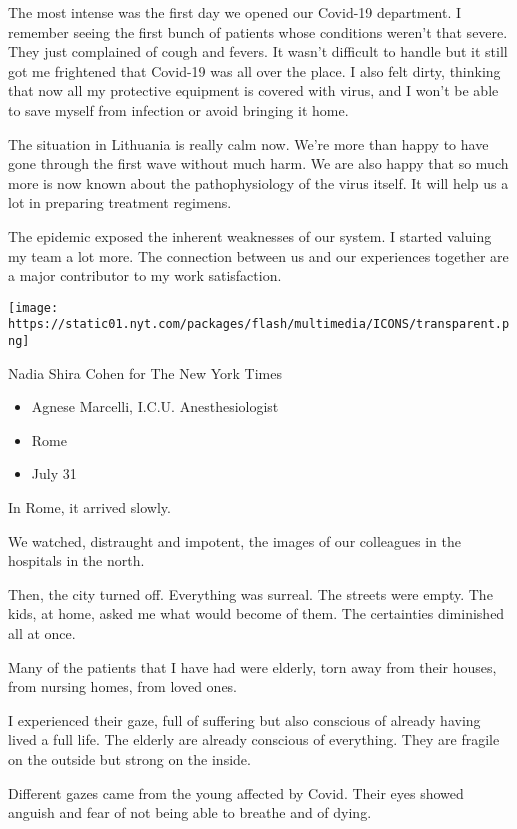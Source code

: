 The most intense was the first day we opened our Covid-19 department. I
remember seeing the first bunch of patients whose conditions weren't
that severe. They just complained of cough and fevers. It wasn't
difficult to handle but it still got me frightened that Covid-19 was all
over the place. I also felt dirty, thinking that now all my protective
equipment is covered with virus, and I won't be able to save myself from
infection or avoid bringing it home.

The situation in Lithuania is really calm now. We're more than happy to
have gone through the first wave without much harm. We are also happy
that so much more is now known about the pathophysiology of the virus
itself. It will help us a lot in preparing treatment regimens.

The epidemic exposed the inherent weaknesses of our system. I started
valuing my team a lot more. The connection between us and our
experiences together are a major contributor to my work satisfaction.

\texttt{[image: https://static01.nyt.com/packages/flash/multimedia/ICONS/transparent.png]}

Nadia Shira Cohen for The New York Times

\begin{itemize}
\tightlist
\item
  Agnese Marcelli, I.C.U. Anesthesiologist
\item
  Rome
\item
  July 31
\end{itemize}

In Rome, it arrived slowly.

We watched, distraught and impotent, the images of our colleagues in the
hospitals in the north.

Then, the city turned off. Everything was surreal. The streets were
empty. The kids, at home, asked me what would become of them. The
certainties diminished all at once.

Many of the patients that I have had were elderly, torn away from their
houses, from nursing homes, from loved ones.

I experienced their gaze, full of suffering but also conscious of
already having lived a full life. The elderly are already conscious of
everything. They are fragile on the outside but strong on the inside.

Different gazes came from the young affected by Covid. Their eyes showed
anguish and fear of not being able to breathe and of dying.

